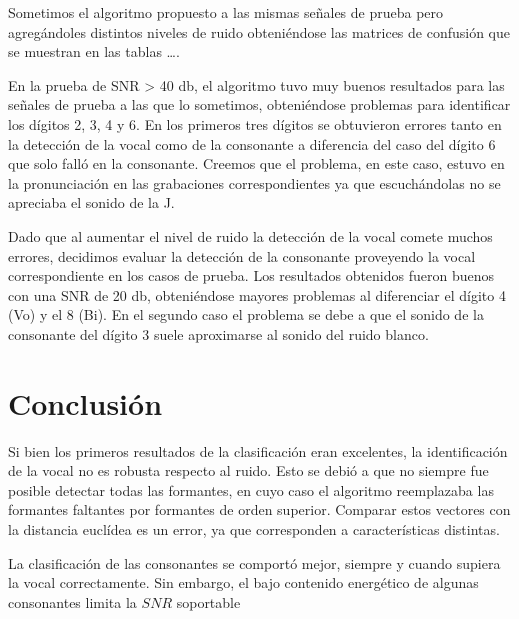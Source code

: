 \documentclass[conference,a4paper,10pt,oneside,final]{tfmpd}
\begin{document}
Sometimos el algoritmo propuesto a las mismas señales de prueba pero
agregándoles distintos niveles de ruido obteniéndose las matrices de
confusión que se muestran en las tablas ….

En la prueba de SNR > 40 db, el algoritmo tuvo muy buenos resultados
para las señales de prueba a las que lo sometimos, obteniéndose
problemas para identificar los dígitos 2, 3, 4 y 6. En los primeros tres
dígitos se obtuvieron errores tanto en la detección de la vocal como
de la consonante a diferencia del caso del dígito 6 que solo falló
en la consonante. Creemos que el problema, en este caso, estuvo en la
pronunciación en las grabaciones correspondientes ya que escuchándolas
no se apreciaba el sonido de la J.

Dado que al aumentar el nivel de ruido la detección de la vocal
comete muchos errores, decidimos evaluar la detección de la consonante
proveyendo la vocal correspondiente en los casos de prueba. Los resultados
obtenidos fueron buenos con una SNR de 20 db, obteniéndose mayores
problemas al diferenciar  el dígito 4 (Vo) y el 8 (Bi). En el segundo
caso el problema se debe a que el sonido de la consonante del dígito
3 suele aproximarse al sonido del ruido blanco.

\section{Conclusión}

Si bien los primeros resultados de la clasificación eran excelentes,
la identificación de la vocal no es robusta respecto al ruido.
Esto se debió a que no siempre fue posible detectar todas las formantes,
en cuyo caso el algoritmo reemplazaba las formantes faltantes por formantes de orden superior.
Comparar estos vectores con la distancia euclídea es un error, ya que corresponden a características
distintas.

La clasificación de las consonantes se comportó mejor, siempre y cuando supiera la vocal correctamente.
Sin embargo, el bajo contenido energético de algunas consonantes limita la $SNR$ soportable





\nocite{*}  
\end{document}
